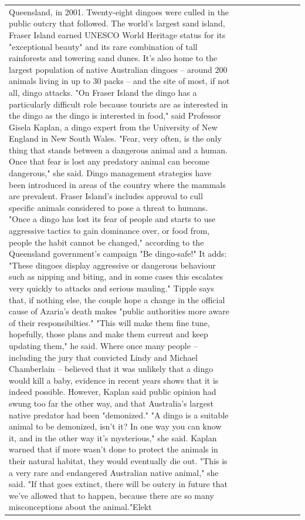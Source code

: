 \begin{table}[H]
\begin{tabular}{lllrlllll}
Queensland, in 2001. Twenty-eight dingoes were culled in the public outcry that followed. The world's largest sand island, Fraser Island earned UNESCO World Heritage status for its "exceptional beauty" and its rare combination of tall rainforests and towering sand dunes. It's also home to the largest population of native Australian dingoes -- around 200 animals living in up to 30 packs -- and the site of most, if not all, dingo attacks. "On Fraser Island the dingo has a particularly difficult role because tourists are as interested in the dingo as the dingo is interested in food," said Professor Gisela Kaplan, a dingo expert from the University of New England in New South Wales. "Fear, very often, is the only thing that stands between a dangerous animal and a human. Once that fear is lost any predatory animal can become dangerous," she said. Dingo management strategies have been introduced in areas of the country where the mammals are prevalent. Fraser Island's includes approval to cull specific animals considered to pose a threat to humans. "Once a dingo has lost its fear of people and starts to use aggressive tactics to gain dominance over, or food from, people the habit cannot be changed," according to the Queensland government's campaign "Be dingo-safe!" It adds: "These dingoes display aggressive or dangerous behaviour such as nipping and biting, and in some cases this escalates very quickly to attacks and serious mauling." Tipple says that, if nothing else, the couple hope a change in the official cause of Azaria's death makes "public authorities more aware of their responsibilties." "This will make them fine tune, hopefully, those plans and make them current and keep updating them," he said. Where once many people -- including the jury that convicted Lindy and Michael Chamberlain -- believed that it was unlikely that a dingo would kill a baby, evidence in recent years shows that it is indeed possible. However, Kaplan said public opinion had swung too far the other way, and that Australia's largest native predator had been "demonized." "A dingo is a suitable animal to be demonized, isn't it? In one way you can know it, and in the other way it's mysterious," she said. Kaplan warned that if more wasn't done to protect the animals in their natural habitat, they would eventually die out. "This is a very rare and endangered Australian native animal," she said. "If that goes extinct, there will be outcry in future that we've allowed that to happen, because there are so many misconceptions about the animal."Elekt \\

\end{tabular}
\end{table}

